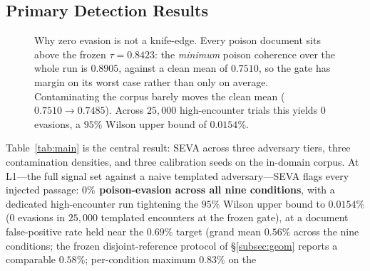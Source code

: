 \documentclass[10pt,journal,compsoc]{IEEEtran}
\begin{document}
\subsection{Primary Detection Results}
\label{subsec:main}

\begin{figure}[t]
\centering
{}
\caption{Why zero evasion is not a knife-edge. Every poison document sits above the
frozen $\tau=0.8423$: the \emph{minimum} poison coherence over the whole run is $0.8905$, against
a clean mean of $0.7510$, so the gate has margin on its worst case rather than only on average.
Contaminating the corpus barely moves the clean mean ($0.7510\to0.7485$). Across $25{,}000$
high-encounter trials this yields $0$ evasions, a $95\%$ Wilson upper bound of $0.0154\%$.}
\label{fig:ci}
\end{figure}
Table~\ref{tab:main} is the central result: SEVA across three adversary tiers,
three contamination densities, and three calibration seeds on the in-domain
corpus. At L1---the full signal set against a naive templated adversary---SEVA
flags every injected passage: \textbf{$0\%$ poison-evasion across all nine
conditions}, with a dedicated high-encounter run tightening the $95\%$ Wilson upper
bound to $0.0154\%$ ($0$ evasions in $25{,}000$ templated encounters at the frozen
gate), at a document false-positive rate held near the $0.69\%$ target (grand mean
$0.56\%$ across the nine conditions; the frozen disjoint-reference protocol of
\S\ref{subsec:geom} reports a comparable $0.58\%$; per-condition maximum $0.83\%$ on the
\end{document}
